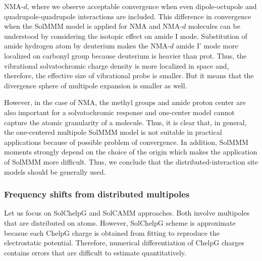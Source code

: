 \documentclass[a4paper,titlepage,twoside,fleqn,12pt]{book}
\begin{document}
\begin{refsection}
NMA-$d$, where we observe acceptable convergence when
even dipole\hyp{}octupole and quadrupole\hyp{}quadrupole
interactions are included.
This difference in convergence
when the SolMMM model is applied for NMA and
NMA-$d$ molecules can be understood by considering the isotopic
effect on amide I mode. Substitution of amide hydrogen
atom by deuterium makes the NMA-$d$ amide I' mode more localized
on carbonyl group because deuterium is heavier than prot. 
Thus, the vibrational solvatochromic charge
density is more localized in space and, therefore, the effective
size of vibrational probe is smaller. 
But it means that the divergence sphere
of multipole expansion is smaller as well. 

However, in the case of NMA,
the methyl groups and amide proton center are also important for a solvatochromic
response and one\hyp{}center model cannot capture the atomic
granularity of a molecule. Thus, it is clear that, in general,
the one\hyp{}centered multipole SolMMM model is not suitable in
practical applications because of possible problem of convergence.
In addition, SolMMM moments strongly depend on the choice of the
origin\citep{Lee.Choi.Cho.JCP.2012} which makes the application
of SolMMM more difficult.
Thus, we conclude that the distributed\hyp{}interaction site
models should be generally used.

\subsubsection{Frequency shifts from distributed multipoles}

Let us focus on SolChelpG and SolCAMM approaches. Both involve multipoles
that are distributed on atoms. However, SolChelpG scheme is approximate
becasue each ChelpG charge is obtained from fitting to reproduce the electrostatic
potential. Therefore, numerical differentiation of ChelpG charges
contains errors that are difficult to estimate quantitatively.


\end{refsection}
\end{document}
